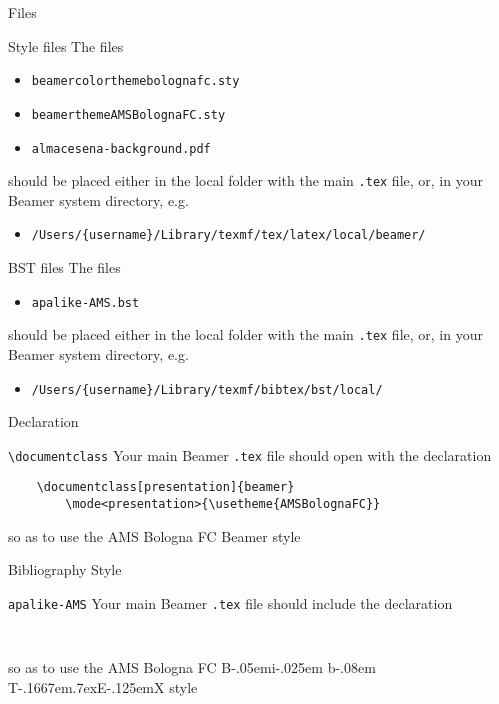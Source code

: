 \documentclass[presentation,apice]{beamer}\mode<presentation>{\usetheme{AMSBolognaFC}}
\def\BibTeX{{\rm B\kern-.05em{\sc i\kern-.025em b}\kern-.08em
    T\kern-.1667em\lower.7ex\hbox{E}\kern-.125emX}}
\begin{document}
\begin{frame}[c,allowframebreaks]{Files}
%
\begin{block}{Style files}
The files
\begin{itemize}
	\item \texttt{beamercolorthemebolognafc.sty}
	\item \texttt{beamerthemeAMSBolognaFC.sty}
	\item \texttt{almacesena-background.pdf}
\end{itemize}
should be placed either in the local folder with the main \texttt{.tex} file, or, in your Beamer system directory, e.g.
\begin{itemize}
	\item \texttt{/Users/\{username\}/Library/texmf/tex/latex/local/beamer/}
\end{itemize}
\end{block}
%
\begin{block}{BST files}
The files
\begin{itemize}
	\item \texttt{apalike-AMS.bst}
\end{itemize}
should be placed either in the local folder with the main \texttt{.tex} file, or, in your Beamer system directory, e.g.
\begin{itemize}
	\item \texttt{/Users/\{username\}/Library/texmf/bibtex/bst/local/}
\end{itemize}
\end{block}
%
\end{frame}

\begin{frame}[c,fragile]{Declaration}
%
\begin{block}{\texttt{\textbackslash{}documentclass}}
Your main Beamer \texttt{.tex} file should open with the declaration
%
\begin{verbatim}
    \documentclass[presentation]{beamer}
        \mode<presentation>{\usetheme{AMSBolognaFC}}
\end{verbatim}
%
so as to use the AMS Bologna FC Beamer style 
\end{block}
%
\end{frame}

\begin{frame}[c,fragile]{Bibliography Style}
%
\begin{block}{\texttt{apalike-AMS}}
Your main Beamer \texttt{.tex} file should include the declaration
\begin{verbatim}
    
\end{verbatim}	
so as to use the AMS Bologna FC \BibTeX{} style 
\end{block}
%
\end{frame}
\end{document}
